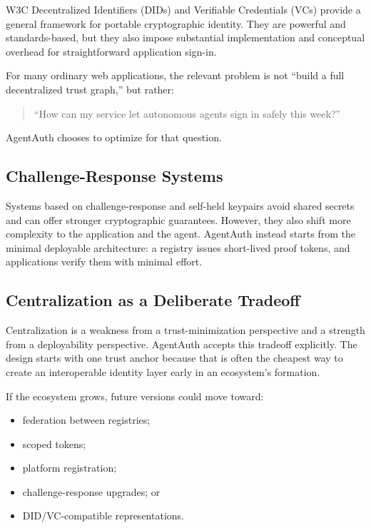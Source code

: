 \documentclass[11pt]{article}
\begin{document}
W3C Decentralized Identifiers (DIDs) and Verifiable Credentials (VCs) provide a general framework for portable cryptographic identity. They are powerful and standards-based, but they also impose substantial implementation and conceptual overhead for straightforward application sign-in.

For many ordinary web applications, the relevant problem is not ``build a full decentralized trust graph,'' but rather:

\begin{quote}
``How can my service let autonomous agents sign in safely this week?''
\end{quote}

AgentAuth chooses to optimize for that question.

\subsection{Challenge-Response Systems}

Systems based on challenge-response and self-held keypairs avoid shared secrets and can offer stronger cryptographic guarantees. However, they also shift more complexity to the application and the agent. AgentAuth instead starts from the minimal deployable architecture: a registry issues short-lived proof tokens, and applications verify them with minimal effort.

\subsection{Centralization as a Deliberate Tradeoff}

Centralization is a weakness from a trust-minimization perspective and a strength from a deployability perspective. AgentAuth accepts this tradeoff explicitly. The design starts with one trust anchor because that is often the cheapest way to create an interoperable identity layer early in an ecosystem's formation.

If the ecosystem grows, future versions could move toward:

\begin{itemize}
  \item federation between registries;
  \item scoped tokens;
  \item platform registration;
  \item challenge-response upgrades; or
  \item DID/VC-compatible representations.
\end{itemize}
\end{document}
